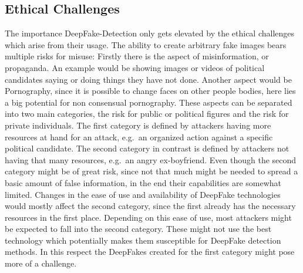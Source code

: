 \subsection{Ethical Challenges}
The importance DeepFake-Detection only gets elevated by the ethical challenges 
which arise from their usage. The ability to create arbitrary fake images bears
multiple risks for misuse: Firstly there is the aspect of misinformation, or
propaganda. An example would be showing images or videos of political candidates
saying or doing things they have not done. Another aspect would be Pornography,
since it is possible to change faces on other people bodies, here lies a big
potential for non consensual pornography. These aspects can be separated into
two main categories, the risk for public or political figures and the risk for
private individuals. The first category is defined by attackers having more
resources at hand for an attack, e.g.\ an organized action against a specific
political candidate. The second category in contrast is defined by attackers not
having that many resources, e.g.\ an angry ex-boyfriend. Even though the second
category might be of great risk, since not that much might be needed to spread a
basic amount of false information, in the end their capabilities are somewhat
limited. Changes in the ease of use and availability of DeepFake technologies
would mostly affect the second category, since the first already has the
necessary resources in the first place. Depending on this ease of use, most
attackers might be expected to fall into the second category. These might not
use the best technology which potentially makes them susceptible for DeepFake
detection methods. In this respect the DeepFakes created for the first category
might pose more of a challenge.
 